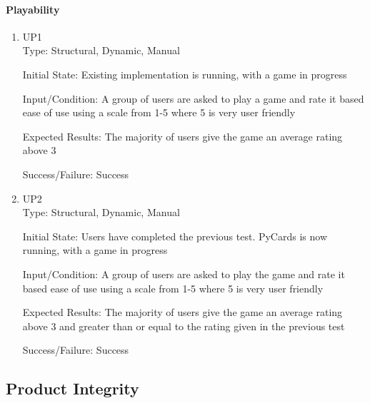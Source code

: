 \documentclass[12pt, titlepage]{article}
\begin{document}
	\paragraph{Playability}
	\begin{enumerate}
		\item{UP1\\}
		Type: Structural, Dynamic, Manual
		
		Initial State: Existing implementation is running, with a game in progress
		
		Input/Condition: A group of users are asked to play a game and rate it based
		ease of use using a scale from 1-5 where 5 is very user friendly
		
		Expected Results: The majority of users give the game an average rating above 3

		Success/Failure: Success

		\item{UP2\\}
		Type: Structural, Dynamic, Manual
		
		Initial State: Users have completed the previous test. PyCards is now running,
		with a game in progress
		
		Input/Condition: A group of users are asked to play the game and rate it based
		ease of use using a scale from 1-5 where 5 is very user friendly
		
		Expected Results: The majority of users give the game an average rating above 3
		and greater than or equal to the rating given in the previous test

		Success/Failure: Success
	\end{enumerate}

	\subsection{Product Integrity}
\end{document}
